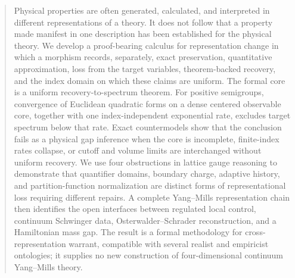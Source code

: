 \begin{abstract}
Physical properties are often generated, calculated, and interpreted in
different representations of a theory.  It does not follow that a property
made manifest in one description has been established for the physical
theory.  We develop a proof-bearing calculus for representation change in
which a morphism records, separately, exact preservation, quantitative
approximation, loss from the target variables, theorem-backed recovery, and
the index domain on which these claims are uniform.  The formal core is a
uniform recovery-to-spectrum theorem.  For positive semigroups, convergence
of Euclidean quadratic forms on a dense centered observable core, together
with one index-independent exponential rate, excludes target spectrum below
that rate.  Exact countermodels show that the conclusion fails as a physical
gap inference when the core is incomplete, finite-index rates collapse, or
cutoff and volume limits are interchanged without uniform recovery.  We use
four obstructions in lattice gauge reasoning to demonstrate that quantifier
domains, boundary charge, adaptive history, and partition-function
normalization are distinct forms of representational loss requiring different
repairs.  A complete Yang--Mills representation chain then identifies the
open interfaces between regulated local control, continuum Schwinger data,
Osterwalder--Schrader reconstruction, and a Hamiltonian mass gap.  The result
is a formal methodology for cross-representation warrant, compatible with
several realist and empiricist ontologies; it supplies no new construction of
four-dimensional continuum Yang--Mills theory.
\end{abstract}
